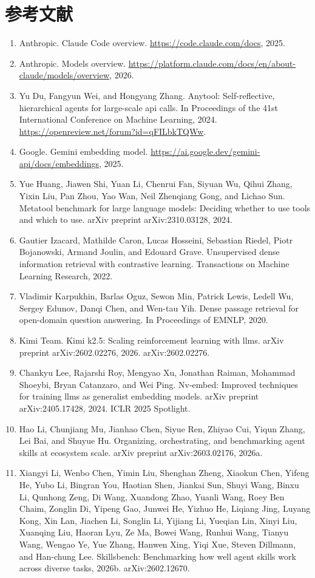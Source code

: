 \documentclass[11pt,UTF8,fontset=fandol]{ctexart}
\begin{document}
\section*{参考文献}
\begin{enumerate}[leftmargin=2em,itemsep=0.2em]
\item Anthropic. Claude Code overview. \url{https://code.claude.com/docs}, 2025.
\item Anthropic. Models overview. \url{https://platform.claude.com/docs/en/about-claude/models/overview}, 2026.
\item Yu Du, Fangyun Wei, and Hongyang Zhang. Anytool: Self-reflective, hierarchical agents for large-scale api calls. In Proceedings of the 41st International Conference on Machine Learning, 2024. \url{https://openreview.net/forum?id=qFILbkTQWw}.
\item Google. Gemini embedding model. \url{https://ai.google.dev/gemini-api/docs/embeddings}, 2025.
\item Yue Huang, Jiawen Shi, Yuan Li, Chenrui Fan, Siyuan Wu, Qihui Zhang, Yixin Liu, Pan Zhou, Yao Wan, Neil Zhenqiang Gong, and Lichao Sun. Metatool benchmark for large language models: Deciding whether to use tools and which to use. arXiv preprint arXiv:2310.03128, 2024.
\item Gautier Izacard, Mathilde Caron, Lucas Hosseini, Sebastian Riedel, Piotr Bojanowski, Armand Joulin, and Edouard Grave. Unsupervised dense information retrieval with contrastive learning. Transactions on Machine Learning Research, 2022.
\item Vladimir Karpukhin, Barlas Oguz, Sewon Min, Patrick Lewis, Ledell Wu, Sergey Edunov, Danqi Chen, and Wen-tau Yih. Dense passage retrieval for open-domain question answering. In Proceedings of EMNLP, 2020.
\item Kimi Team. Kimi k2.5: Scaling reinforcement learning with llms. arXiv preprint arXiv:2602.02276, 2026. arXiv:2602.02276.
\item Chankyu Lee, Rajarshi Roy, Mengyao Xu, Jonathan Raiman, Mohammad Shoeybi, Bryan Catanzaro, and Wei Ping. Nv-embed: Improved techniques for training llms as generalist embedding models. arXiv preprint arXiv:2405.17428, 2024. ICLR 2025 Spotlight.
\item Hao Li, Chunjiang Mu, Jianhao Chen, Siyue Ren, Zhiyao Cui, Yiqun Zhang, Lei Bai, and Shuyue Hu. Organizing, orchestrating, and benchmarking agent skills at ecosystem scale. arXiv preprint arXiv:2603.02176, 2026a.
\item Xiangyi Li, Wenbo Chen, Yimin Liu, Shenghan Zheng, Xiaokun Chen, Yifeng He, Yubo Li, Bingran You, Haotian Shen, Jiankai Sun, Shuyi Wang, Binxu Li, Qunhong Zeng, Di Wang, Xuandong Zhao, Yuanli Wang, Roey Ben Chaim, Zonglin Di, Yipeng Gao, Junwei He, Yizhuo He, Liqiang Jing, Luyang Kong, Xin Lan, Jiachen Li, Songlin Li, Yijiang Li, Yueqian Lin, Xinyi Liu, Xuanqing Liu, Haoran Lyu, Ze Ma, Bowei Wang, Runhui Wang, Tianyu Wang, Wengao Ye, Yue Zhang, Hanwen Xing, Yiqi Xue, Steven Dillmann, and Han-chung Lee. Skillsbench: Benchmarking how well agent skills work across diverse tasks, 2026b. arXiv:2602.12670.

\end{enumerate}
\end{document}
